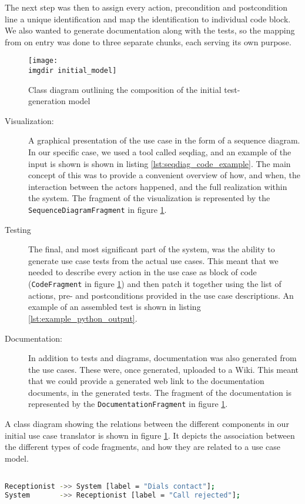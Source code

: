 \noindent The next step was then to assign every action, precondition and postcondition line a unique identification and map the identification to individual code block. We also wanted to generate documentation along with the tests, so the mapping from on entry was done to three separate chunks, each serving its own purpose.
\begin{figure}[!htbp]
\centering
\texttt{[image: \\imgdir initial\_model]}
\caption{Class diagram outlining the composition of the initial test-generation model}
\label{fig:first_generation_model}
\end{figure}
\begin{description}

  \item[Visualization:] A graphical presentation of the use case in the form of a sequence diagram. In our specific case, we used a tool called seqdiag, and an example of the input is shown is shown in listing \ref{lst:seqdiag_code_example}. The main concept of this was to provide a convenient overview of how, and when, the interaction between the actors happened, and the full realization within the system. The fragment of the visualization is represented by the \texttt{SequenceDiagramFragment} in figure \ref{fig:first_generation_model}.

  \item[Testing] The final, and most significant part of the system, was the ability to generate use case tests from the actual use cases. This meant that we needed to describe every action in the use case as block of code (\texttt{CodeFragment} in figure \ref{fig:first_generation_model}) and then patch it together using the list of actions, pre- and postconditions provided in the use case descriptions. An example of an assembled test is shown in listing \ref{lst:example_python_output}.

  \item[Documentation:] In addition to tests and diagrams, documentation was also generated from the use cases. These were, once generated, uploaded to a Wiki. This meant that we could provide a generated web link to the documentation documents, in the generated tests. The fragment of the documentation is represented by the \texttt{DocumentationFragment} in figure \ref{fig:first_generation_model}.
\end{description}
\noindent
A class diagram showing the relations between the different components in our initial use case translator is shown in figure \ref{fig:first_generation_model}. It depicts the association between the different types of code fragments, and how they are related to a use case model.
\begin{lstlisting}[language=Bash, caption=Example seqdiag input fragment, label=lst:seqdiag_code_example]

Receptionist ->> System [label = "Dials contact"];
System       ->> Receptionist [label = "Call rejected"];
\end{lstlisting}

